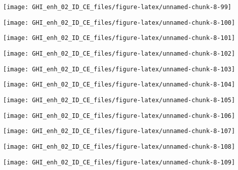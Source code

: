 \documentclass[
  10pt,
  a4paper,oneside]{article}
\begin{document}
\begin{center}\texttt{[image: GHI\_enh\_02\_ID\_CE\_files/figure-latex/unnamed-chunk-8-99]} \end{center}

\begin{center}\texttt{[image: GHI\_enh\_02\_ID\_CE\_files/figure-latex/unnamed-chunk-8-100]} \end{center}

\begin{center}\texttt{[image: GHI\_enh\_02\_ID\_CE\_files/figure-latex/unnamed-chunk-8-101]} \end{center}

\begin{center}\texttt{[image: GHI\_enh\_02\_ID\_CE\_files/figure-latex/unnamed-chunk-8-102]} \end{center}

\begin{center}\texttt{[image: GHI\_enh\_02\_ID\_CE\_files/figure-latex/unnamed-chunk-8-103]} \end{center}

\begin{center}\texttt{[image: GHI\_enh\_02\_ID\_CE\_files/figure-latex/unnamed-chunk-8-104]} \end{center}

\begin{center}\texttt{[image: GHI\_enh\_02\_ID\_CE\_files/figure-latex/unnamed-chunk-8-105]} \end{center}

\begin{center}\texttt{[image: GHI\_enh\_02\_ID\_CE\_files/figure-latex/unnamed-chunk-8-106]} \end{center}

\begin{center}\texttt{[image: GHI\_enh\_02\_ID\_CE\_files/figure-latex/unnamed-chunk-8-107]} \end{center}

\begin{center}\texttt{[image: GHI\_enh\_02\_ID\_CE\_files/figure-latex/unnamed-chunk-8-108]} \end{center}

\begin{center}\texttt{[image: GHI\_enh\_02\_ID\_CE\_files/figure-latex/unnamed-chunk-8-109]} \end{center}
\end{document}
